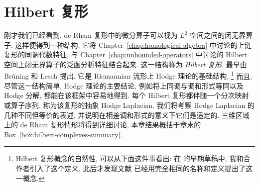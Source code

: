 \clearpage\setcounter{chapter}{3}
\chapter{{Hilbert 复形}}\label{chap:hilbert-complexes}

{刚才我们已经看到, de Rham 复形中的微分算子可以视为 $L^2$ 空间之间的闭无界算子. 这样便得到一种结构, 它将 Chapter~\ref{chap:homological-algebra} 中讨论的上链复形的同调代数特征, 与 Chapter~\ref{chap:unbounded-operators} 中讨论的 Hilbert 空间上闭无界算子的泛函分析特征结合起来. 这一结构称为 \emph{Hilbert 复形}, 最早由 Brüning 和 Lesch  提出. 它是 Riemannian 流形上 Hodge 理论的基础结构,}%
\footnote{{Hilbert 复形概念的自然性, 可以从下面这件事看出: 在  的早期草稿中, 我和合作者引入了这个定义, 此后才发现文献  已经用完全相同的名称和定义提出了这一概念.}}%
{而且, 尽管这一结构简单, Hodge 理论的主要结论, 例如将上同调与调和形式等同以及 Hodge 分解, 都能在该框架中容易地得到. 每个 Hilbert 复形都伴随一个分次映射或算子序列, 称为该复形的抽象 Hodge Laplacian. 我们将考察 Hodge Laplacian 的几种不同但等价的表述, 并说明在相差调和形式的意义下它们是适定的. 三维区域上的 de Rham 复形情形将得到详细讨论, 本章结果概括于章末的 Box~\ref{box:hilbert-complexes-summary}.}
